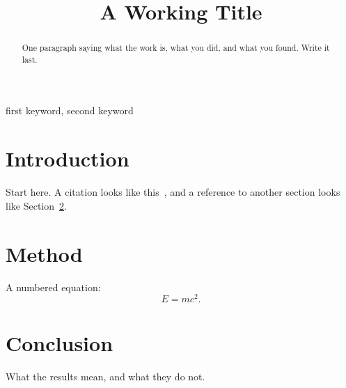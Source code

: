 \documentclass[conference]{IEEEtran}
\begin{document}
\title{A Working Title}

\author{
}

\maketitle

\begin{abstract}
One paragraph saying what the work is, what you did, and what you found.
Write it last.
\end{abstract}

\begin{IEEEkeywords}
first keyword, second keyword
\end{IEEEkeywords}

\section{Introduction}
\label{sec:introduction}

Start here.  A citation looks like this~\cite{knuth1984}, and a reference to
another section looks like Section~\ref{sec:method}.

\section{Method}
\label{sec:method}

A numbered equation:
\begin{equation}
  \label{eq:example}
  E = mc^2.
\end{equation}

\section{Conclusion}

What the results mean, and what they do not.



\end{document}
